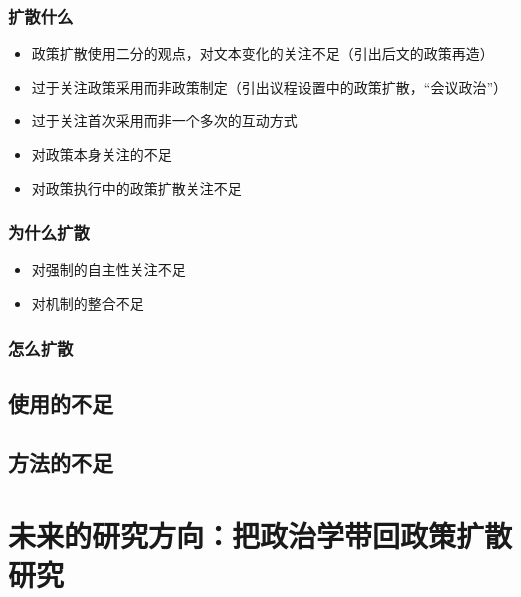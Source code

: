\documentclass[
  12pt,
]{ctexart}
\begin{document}
\hypertarget{ux6269ux6563ux4ec0ux4e48-1}{%
\subsubsection{扩散什么}\label{ux6269ux6563ux4ec0ux4e48-1}}

\begin{itemize}
\item
  政策扩散使用二分的观点，对文本变化的关注不足（引出后文的政策再造）
\item
  过于关注政策采用而非政策制定（引出议程设置中的政策扩散，``会议政治''）
\item
  过于关注首次采用而非一个多次的互动方式
\item
  对政策本身关注的不足
\item
  对政策执行中的政策扩散关注不足
\end{itemize}

\hypertarget{ux4e3aux4ec0ux4e48ux6269ux6563}{%
\subsubsection{为什么扩散}\label{ux4e3aux4ec0ux4e48ux6269ux6563}}

\begin{itemize}
\item
  对强制的自主性关注不足
\item
  对机制的整合不足
\end{itemize}

\hypertarget{ux600eux4e48ux6269ux6563}{%
\subsubsection{怎么扩散}\label{ux600eux4e48ux6269ux6563}}

\hypertarget{ux4f7fux7528ux7684ux4e0dux8db3}{%
\subsection{使用的不足}\label{ux4f7fux7528ux7684ux4e0dux8db3}}

\hypertarget{ux65b9ux6cd5ux7684ux4e0dux8db3}{%
\subsection{方法的不足}\label{ux65b9ux6cd5ux7684ux4e0dux8db3}}

\hypertarget{ux672aux6765ux7684ux7814ux7a76ux65b9ux5411ux628aux653fux6cbbux5b66ux5e26ux56deux653fux7b56ux6269ux6563ux7814ux7a76}{%
\section{未来的研究方向：把政治学带回政策扩散研究}\label{ux672aux6765ux7684ux7814ux7a76ux65b9ux5411ux628aux653fux6cbbux5b66ux5e26ux56deux653fux7b56ux6269ux6563ux7814ux7a76}}
\end{document}
